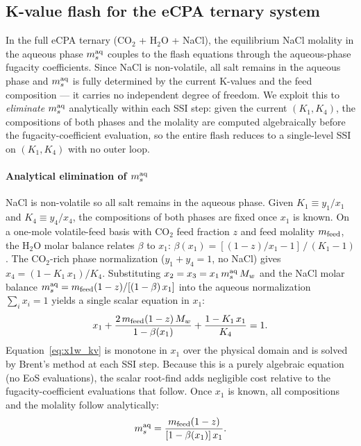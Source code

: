 \documentclass[preprint,12pt,authoryear]{elsarticle}
\begin{document}
\subsection{K-value flash for the eCPA ternary system}
\label{sec:kv_flash}

In the full eCPA ternary (CO$_2$ + H$_2$O + NaCl), the equilibrium NaCl molality
in the aqueous phase $m_s^{\rm aq}$ couples to the flash equations through the
aqueous-phase fugacity coefficients.
Since NaCl is non-volatile, all salt remains in the aqueous phase and
$m_s^{\rm aq}$ is fully determined by the current K-values and the feed
composition — it carries no independent degree of freedom.
We exploit this to \emph{eliminate} $m_s^{\rm aq}$ analytically within each
SSI step: given the current $(K_1, K_4)$, the compositions of both phases and
the molality are computed algebraically before the fugacity-coefficient
evaluation, so the entire flash reduces to a single-level SSI on $(K_1, K_4)$
with no outer loop.

\paragraph{Analytical elimination of $m_s^{\rm aq}$}
NaCl is non-volatile so all salt remains in the aqueous phase.
Given $K_1 \equiv y_1/x_1$ and $K_4 \equiv y_4/x_4$, the compositions
of both phases are fixed once $x_1$ is known.
On a one-mole volatile-feed basis with CO$_2$ feed fraction $z$ and feed molality
$m_{\rm feed}$, the H$_2$O molar balance relates $\beta$ to $x_1$:
$\beta(x_1) = [(1-z)/x_1 - 1]\,/\,(K_1 - 1)$.
The CO$_2$-rich phase normalization ($y_1 + y_4 = 1$, no NaCl) gives
$x_4 = (1 - K_1\,x_1)/K_4$.
Substituting $x_2 = x_3 = x_1\,m_s^{\rm aq}\,M_w$ and the NaCl molar
balance $m_s^{\rm aq} = m_{\rm feed}(1-z)/[(1-\beta)\,x_1]$ into the aqueous
normalization $\sum_i x_i = 1$ yields a single scalar equation in
$x_1$:
\begin{equation}
  x_1
  + \frac{2\,m_{\rm feed}(1-z)\,M_w}{1 - \beta(x_1)}
  + \frac{1 - K_1\,x_1}{K_4} = 1.
  \label{eq:x1w_kv}
\end{equation}
Equation~\eqref{eq:x1w_kv} is monotone in $x_1$ over the physical domain and is
solved by Brent's method at each SSI step.
Because this is a purely algebraic equation (no EoS evaluations), the scalar
root-find adds negligible cost relative to the fugacity-coefficient evaluations
that follow.
Once $x_1$ is known, all compositions and the molality follow analytically:
\begin{equation}
  m_s^{\rm aq} = \frac{m_{\rm feed}(1-z)}{[1-\beta(x_1)]\,x_1}.
  \label{eq:msaq_kv}
\end{equation}
\end{document}

